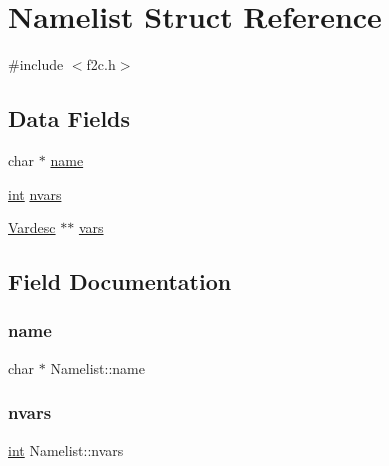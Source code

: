 \hypertarget{struct_namelist}{}\section{Namelist Struct Reference}
\label{struct_namelist}


{\ttfamily \#include $<$f2c.\+h$>$}

\subsection*{Data Fields}
\begin{DoxyCompactItemize}
\item 
char $\ast$ \hyperlink{struct_namelist_a6d6b743f196177bd995084dad7c4ffe0}{name}
\item 
\hyperlink{lp__lib_8h_adeb9ec6400320e4923ac9d836d509ddb}{int} \hyperlink{struct_namelist_a30a6e0a05803290fed780890bcc436fa}{nvars}
\item 
\hyperlink{struct_vardesc}{Vardesc} $\ast$$\ast$ \hyperlink{struct_namelist_a01399e708a5c9b1e87f195b2e2690230}{vars}
\end{DoxyCompactItemize}


\subsection{Field Documentation}
\mbox{\label{struct_namelist_a6d6b743f196177bd995084dad7c4ffe0}} 
\subsubsection{\texorpdfstring{name}{name}}
{\footnotesize\ttfamily char $\ast$ Namelist\+::name}

\mbox{\label{struct_namelist_a30a6e0a05803290fed780890bcc436fa}} 
\subsubsection{\texorpdfstring{nvars}{nvars}}
{\footnotesize\ttfamily \hyperlink{lp__lib_8h_adeb9ec6400320e4923ac9d836d509ddb}{int} Namelist\+::nvars}

\mbox{\label{struct_namelist_a01399e708a5c9b1e87f195b2e2690230}} 
